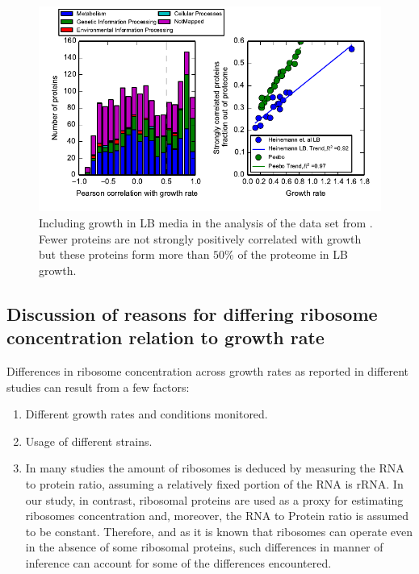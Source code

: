 \documentclass[a4paper]{article}
\begin{document}
\begin{figure}[H]
\begin{center}
\includegraphics[width=1\columnwidth]{HeinemannsummaryHistAndGr.pdf}
\caption{\label{fig:LB}
Including growth in LB media in the analysis of the data set from \cite{Heinemann2015}.
Fewer proteins are not strongly positively correlated with growth but these proteins form more than $50\%$ of the proteome in LB growth.%
}
\end{center}
\end{figure}

\subsection{Discussion of reasons for differing ribosome concentration relation to growth rate}
\label{ribosomeconc} 

Differences in ribosome concentration  across growth rates as reported in different studies can result from a few factors:
\begin{enumerate}
\item Different growth rates and conditions monitored.
\item Usage of different strains.
\item In many studies the amount of ribosomes is deduced by measuring the RNA to protein ratio, assuming a relatively fixed portion of the RNA is rRNA.
In our study, in contrast, ribosomal proteins are used as a proxy for estimating ribosomes concentration and, moreover, the RNA to Protein ratio is assumed to be constant.
Therefore, and as it is known that ribosomes can operate even in the absence of some ribosomal proteins, such differences in manner of inference can account for some of the differences encountered.
\end{enumerate}
\end{document}
